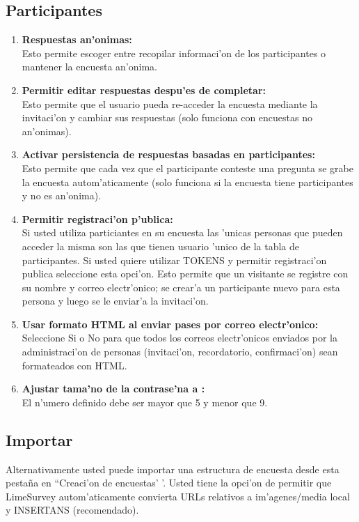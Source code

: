 \documentclass[12pt,spanish]{report}
\begin{document}
\subsection{Participantes}
	\begin{enumerate}
		\item {\bf Respuestas an'onimas: }\\
			Esto permite escoger entre recopilar informaci'on de los participantes  o mantener la encuesta an'onima.
		\item {\bf Permitir editar respuestas despu'es de completar: }\\
			Esto permite que el usuario pueda re-acceder la encuesta mediante la invitaci'on y cambiar sus respuestas (solo funciona con encuestas no an'onimas).
		\item  {\bf Activar persistencia de respuestas basadas en participantes:} \\
			Esto permite que cada vez que el participante conteste una pregunta se grabe la encuesta autom'aticamente (solo funciona si la encuesta tiene participantes y no es an'onima).
		\item  {\bf Permitir registraci'on p'ublica: }\\
			Si usted utiliza particiantes en su encuesta las 'unicas personas que pueden acceder la misma son las que tienen usuario 'unico de la tabla de participantes. Si usted quiere utilizar TOKENS y permitir registraci'on publica seleccione esta opci'on. Esto permite que un visitante se registre con su nombre y correo electr'onico; se crear'a un participante nuevo para esta persona y luego se le enviar'a la invitaci'on.
		\item {\bf Usar formato HTML al enviar pases por correo electr'onico:}\\
			 Seleccione Si o No para que todos los correos electr'onicos enviados por la administraci'on de personas (invitaci'on, recordatorio, confirmaci'on) sean formateados con HTML.
		\item {\bf Ajustar tama'no de la contrase'na a : }\\
			El n'umero definido debe ser mayor que 5 y menor que 9.
	\end{enumerate}
	
\subsection{Importar}

Alternativamente usted puede importar una estructura de encuesta desde esta pestaña en ``Creaci'on de encuestas' '. Usted tiene la opci'on de permitir que LimeSurvey autom'aticamente convierta URLs relativos a im'agenes/media local y INSERTANS (recomendado).
\end{document}
